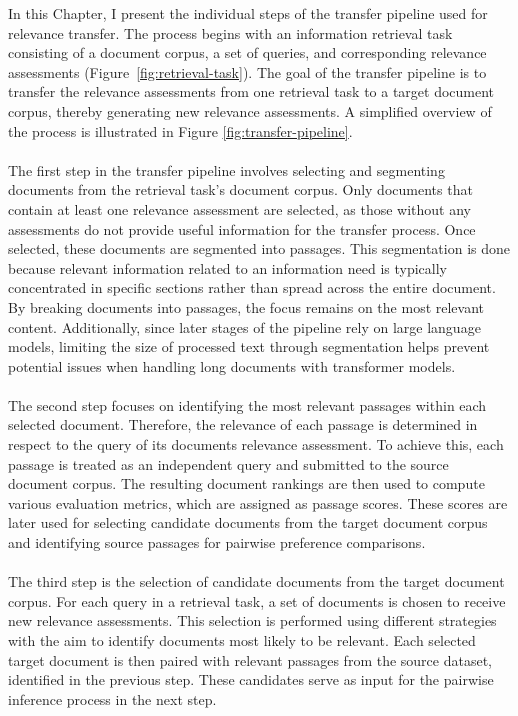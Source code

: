 In this Chapter, I present the individual steps of the transfer pipeline used for relevance transfer. The process begins with an information retrieval task consisting of a document corpus, a set of queries, and corresponding relevance assessments (Figure~\ref{fig:retrieval-task}). The goal of the transfer pipeline is to transfer the relevance assessments from one retrieval task to a target document corpus, thereby generating new relevance assessments. A simplified overview of the process is illustrated in Figure \ref{fig:transfer-pipeline}.
\\\\
The first step in the transfer pipeline involves selecting and segmenting documents from the retrieval task's document corpus. Only documents that contain at least one relevance assessment are selected, as those without any assessments do not provide useful information for the transfer process. Once selected, these documents are segmented into passages. This segmentation is done because relevant information related to an information need is typically concentrated in specific sections rather than spread across the entire document. By breaking documents into passages, the focus remains on the most relevant content. Additionally, since later stages of the pipeline rely on large language models, limiting the size of processed text through segmentation helps prevent potential issues when handling long documents with transformer models.
\\\\
The second step focuses on identifying the most relevant passages within each selected document. Therefore, the relevance of each passage is determined in respect to the query of its documents relevance assessment. To achieve this, each passage is treated as an independent query and submitted to the source document corpus. The resulting document rankings are then used to compute various evaluation metrics, which are assigned as passage scores. These scores are later used for selecting candidate documents from the target document corpus and identifying source passages for pairwise preference comparisons.
\\\\
The third step is the selection of candidate documents from the target document corpus. For each query in a retrieval task, a set of documents is chosen to receive new relevance assessments. This selection is performed using different strategies with the aim to identify documents most likely to be relevant. Each selected target document is then paired with relevant passages from the source dataset, identified in the previous step. These candidates serve as input for the pairwise inference process in the next step.
